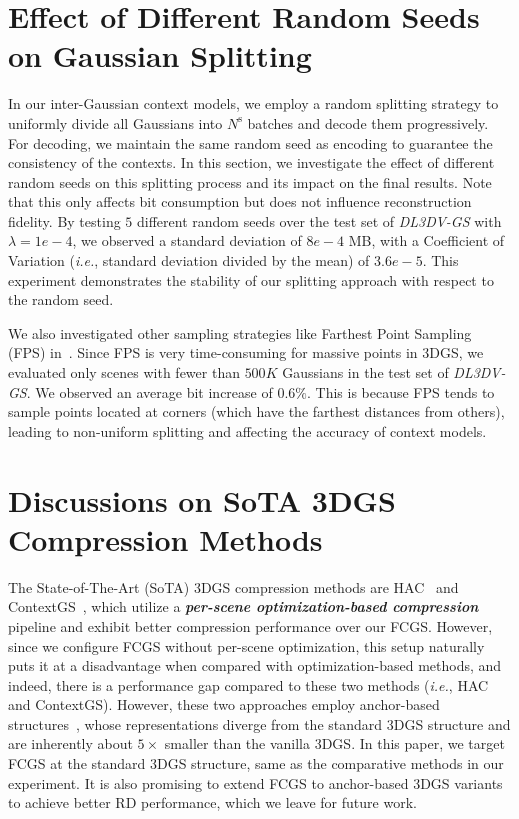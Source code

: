 \documentclass{article} %
\newcommand{\ie}{\textit{i.e.}}
\begin{document}
\section{Effect of Different Random Seeds on Gaussian Splitting}
In our inter-Gaussian context models, we employ a random splitting strategy to uniformly divide all Gaussians into $N^\text{s}$ batches and decode them progressively. For decoding, we maintain the same random seed as encoding to guarantee the consistency of the contexts. In this section, we investigate the effect of different random seeds on this splitting process and its impact on the final results. Note that this only affects bit consumption but does not influence reconstruction fidelity. By testing $5$ different random seeds over the test set of \textit{DL3DV-GS} with $\lambda=1e-4$, we observed a standard deviation of $8e-4$ MB, with a Coefficient of Variation (\ie, standard deviation divided by the mean) of $3.6e-5$. This experiment demonstrates the stability of our splitting approach with respect to the random seed.

We also investigated other sampling strategies like Farthest Point Sampling (FPS) in~\citep{PointNetpp}. Since FPS is very time-consuming for massive points in 3DGS, we evaluated only scenes with fewer than $500K$ Gaussians in the test set of \textit{DL3DV-GS}. We observed an average bit increase of $0.6\%$. This is because FPS tends to sample points located at corners (which have the farthest distances from others), leading to non-uniform splitting and affecting the accuracy of context models.

\clearpage

\section{Discussions on SoTA 3DGS Compression Methods}
\label{sec:SoTA_discussion}
The State-of-The-Art (SoTA) 3DGS compression methods are HAC~\citep{HAC} and ContextGS~\citep{Contextgs}, which utilize a \textit{\textbf{per-scene optimization-based compression}} pipeline and exhibit better compression performance over our FCGS. However, since we configure FCGS without per-scene optimization, this setup naturally puts it at a disadvantage when compared with optimization-based methods, and indeed, there is a performance gap compared to these two methods (\ie, HAC and ContextGS). However, these two approaches employ anchor-based structures~\citep{scaffold}, whose representations diverge from the standard 3DGS structure and are inherently about $5\times$ smaller than the vanilla 3DGS. In this paper, we target FCGS at the standard 3DGS structure, same as the comparative methods in our experiment. It is also promising to extend FCGS to anchor-based 3DGS variants~\citep{scaffold} to achieve better RD performance, which we leave for future work.
\end{document}
